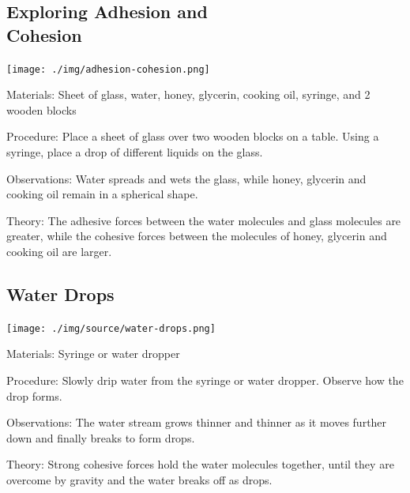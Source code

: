 \begin{multicols}{2}
\columnbreak

\subsection[Exploring Adhesion and Cohesion]{Exploring Adhesion and \hfill \\ Cohesion}

\begin{center}
\texttt{[image: ./img/adhesion-cohesion.png]}
\end{center}

\begin{description*}
\item[Materials:]{Sheet of glass, water, honey, glycerin, cooking oil, syringe, and 2 wooden blocks}
\item[Procedure:]{Place a sheet of glass over two wooden blocks on a table. Using a syringe, place a drop of different liquids on the glass.}
\item[Observations:]{Water spreads and wets the glass, while honey, glycerin and cooking oil remain in a spherical shape.}
\item[Theory:]{The adhesive forces between the water molecules and glass molecules are greater, while the cohesive forces between the molecules of honey, glycerin and cooking oil are larger.}
\end{description*}

\subsection{Water Drops}

\begin{center}
\texttt{[image: ./img/source/water-drops.png]}
\end{center}

\begin{description*}
\item[Materials:]{Syringe or water dropper}
\item[Procedure:]{Slowly drip water from the syringe or water dropper. Observe how the drop forms.}
\item[Observations:]{The water stream grows thinner and thinner as it moves further down and finally breaks to form drops.}
\item[Theory:]{Strong cohesive forces hold the water molecules together, until they are overcome by gravity and the water breaks off as drops.}
\end{description*}



\end{multicols}
